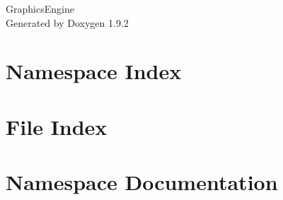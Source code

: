 \documentclass[twoside]{book}
\newcommand{\+}{\discretionary{\mbox{\scriptsize$\hookleftarrow$}}{}{}}
\newcommand{\clearemptydoublepage}{%
    \newpage{\pagestyle{empty}\cleardoublepage}%
  }
\begin{document}
  \raggedbottom
    \hypersetup{pageanchor=false,
                bookmarksnumbered=true,
                pdfencoding=unicode
               }
  \begin{titlepage}
  \vspace*{7cm}
  \begin{center}%
  {\Large Graphics\+Engine}\\
  \vspace*{1cm}
  {\large Generated by Doxygen 1.9.2}\\
  \end{center}
  \end{titlepage}
  \clearemptydoublepage
  \tableofcontents
  \clearemptydoublepage
  \hypersetup{pageanchor=true}
\chapter{Namespace Index}

\chapter{File Index}

\chapter{Namespace Documentation}



\end{document}
